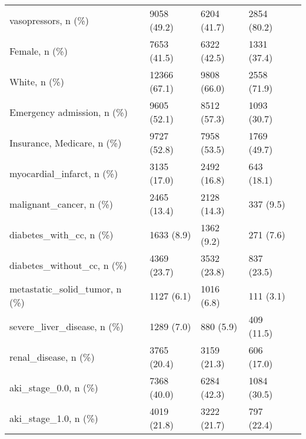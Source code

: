 \documentclass[10pt,letterpaper]{article}
\begin{document}
\begin{table}[h!]
{\begin{tabular}{llllll}
            vasopressors, n (\%)                              &         & 9058 (49.2)   & 6204 (41.7)       & 2854 (80.2)            &         \\
            Female, n (\%)                                    &         & 7653 (41.5)   & 6322 (42.5)       & 1331 (37.4)            &         \\
            White, n (\%)                                     &         & 12366 (67.1)  & 9808 (66.0)       & 2558 (71.9)            &         \\
            Emergency admission, n (\%)                       &         & 9605 (52.1)   & 8512 (57.3)       & 1093 (30.7)            &         \\
            Insurance, Medicare, n (\%)                       &         & 9727 (52.8)   & 7958 (53.5)       & 1769 (49.7)            &         \\
            myocardial\_infarct, n (\%)                       &         & 3135 (17.0)   & 2492 (16.8)       & 643 (18.1)             &         \\
            malignant\_cancer, n (\%)                         &         & 2465 (13.4)   & 2128 (14.3)       & 337 (9.5)              &         \\
            diabetes\_with\_cc, n (\%)                        &         & 1633 (8.9)    & 1362 (9.2)        & 271 (7.6)              &         \\
            diabetes\_without\_cc, n (\%)                     &         & 4369 (23.7)   & 3532 (23.8)       & 837 (23.5)             &         \\
            metastatic\_solid\_tumor, n (\%)                  &         & 1127 (6.1)    & 1016 (6.8)        & 111 (3.1)              &         \\
            severe\_liver\_disease, n (\%)                    &         & 1289 (7.0)    & 880 (5.9)         & 409 (11.5)             &         \\
            renal\_disease, n (\%)                            &         & 3765 (20.4)   & 3159 (21.3)       & 606 (17.0)             &         \\
            aki\_stage\_0.0, n (\%)                           &         & 7368 (40.0)   & 6284 (42.3)       & 1084 (30.5)            &         \\
            aki\_stage\_1.0, n (\%)                           &         & 4019 (21.8)   & 3222 (21.7)       & 797 (22.4)             &         \\

\end{tabular}}
\end{table}
\end{document}
